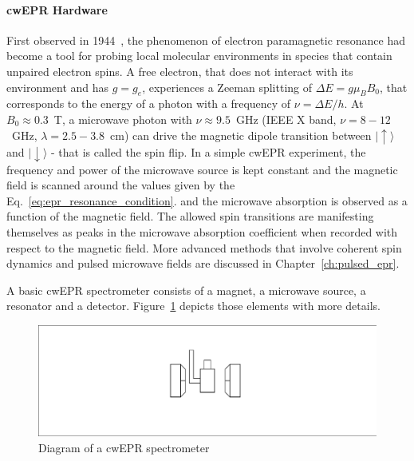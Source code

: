 \paragraph{cwEPR Hardware}
First observed in 1944~\cite{zavoisky_1945,salikhov_2015}, the phenomenon of electron paramagnetic resonance had become a tool for probing local molecular environments in species that contain unpaired electron spins. A free electron, that does not interact with its environment and has $g=g_e$, experiences a Zeeman splitting of $\Delta E = g \mu_B B_0$, that corresponds to the energy of a photon with a frequency of $\nu=\Delta E / h$. At $B_0\approx0.3$~T, a microwave photon with $\nu\approx9.5$~GHz (IEEE X band, $\nu=8-12$~GHz, $\lambda=2.5-3.8$~cm) can drive the magnetic dipole transition between $\vert{\uparrow\rangle}$ and $\vert{\downarrow\rangle}$ - that is called the spin flip. In a simple cwEPR experiment, the frequency and power of the microwave source is kept constant and the magnetic field is scanned around the values given by the Eq.~\ref{eq:epr_resonance_condition}. and the microwave absorption is observed as a function of the magnetic field. The allowed spin transitions are manifesting themselves as peaks in the microwave absorption coefficient when recorded with respect to the magnetic field. More advanced methods that involve coherent spin dynamics and pulsed microwave fields are discussed in Chapter~\ref{ch:pulsed_epr}.
\par
A basic cwEPR spectrometer consists of a magnet, a microwave source, a resonator and a detector. Figure~\ref{fig:cwerp_spectrometer} depicts those elements with more details.
\begin{figure}[h]
\center
	\includegraphics[width=1\textwidth]{./operando_epr/figures/cwEPR_spectrometer_diagram.pdf}
	\caption{Diagram of a cwEPR spectrometer}
	\label{fig:cwerp_spectrometer}
\end{figure}



